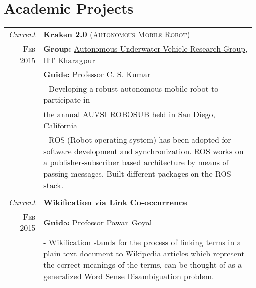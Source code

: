 \documentclass[a4paper,10pt]{article} %
\begin{document}

\section{Academic Projects}

\begin{tabular}{r|p{12cm}}
\emph{Current} & \textbf{Kraken 2.0} \textsc{(Autonomous Mobile Robot)} \\
\textsc{Feb 2015} & \textbf{Group: }\textmd{\href{http://auv-iitkgp.in/}{Autonomous Underwater Vehicle Research Group}}, IIT Kharagpur\\
& \textbf{Guide: }\textmd{\href{http://iitkgp.ac.in/fac-profiles/showprofile.php?empcode=aWmdU}{Professor C. S. Kumar}}\\
& \footnotesize{- Developing a robust autonomous mobile robot to participate in}\\
& \footnotesize{ the annual AUVSI ROBOSUB held in San Diego, California.}\\
& \footnotesize{- ROS (Robot operating system) has been adopted for software development and synchronization. ROS works on a publisher-subscriber based architecture by means of passing messages. Built different packages on the ROS stack.}\\
\multicolumn{2}{c}{} \\


\emph{Current} & \textbf{\href{http://www.cs.sjtu.edu.cn/~kzhu/papers/wikification.pdf}{Wikiﬁcation via Link Co-occurrence}} \\
\textsc{Feb 2015} & \textbf{Guide: }\textmd{\href{http://cse.iitkgp.ac.in/~pawang/}{Professor Pawan Goyal}}\\
& \footnotesize{- Wikiﬁcation stands for the process of linking terms in a plain text document to Wikipedia articles which represent the correct meanings of the terms, can be thought of as a generalized Word Sense Disambiguation problem.}\\
\end{tabular}

\end{document}
